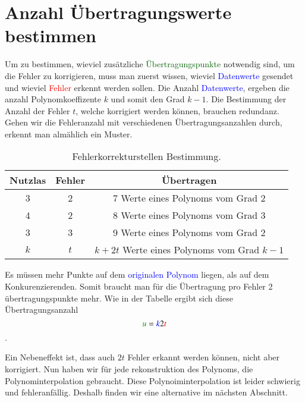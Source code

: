 \section{Anzahl Übertragungswerte bestimmen
\label{reedsolomon:section:Fehlerkorrekturstellen}}
Um zu bestimmen, wieviel zusätzliche \textcolor{darkgreen}{Übertragungspunkte} notwendig sind, um die Fehler zu korrigieren,
    muss man zuerst wissen, wieviel \textcolor{blue}{Datenwerte} gesendet und wieviel \textcolor{red}{Fehler} erkennt werden sollen. 
Die Anzahl \textcolor{blue}{Datenwerte}, ergeben die anzahl Polynomkoeffizente $k$ und somit den Grad $k-1$.
Die Bestimmung der Anzahl der Fehler $t$, welche korrigiert werden können, brauchen redundanz.
Gehen wir die Fehleranzahl mit verschiedenen Übertragungsanzahlen durch, 
    erkennt man almählich ein Muster.
\begin{table}
    \centering
    \begin{tabular}{ c c | c} 
        \hline
        Nutzlas & Fehler & Übertragen \\
        \hline 
        3 & 2 & 7 Werte eines Polynoms vom Grad 2 \\ 
        4 & 2 & 8 Werte eines Polynoms vom Grad 3 \\
        3 & 3 & 9 Werte eines Polynoms vom Grad 2 \\ 
        \hline
        $k$ & $t$ & $k+2t$ Werte eines Polynoms vom Grad $k-1$ \\ 
        \hline
    \end{tabular}
    \caption{ Fehlerkorrekturstellen Bestimmung.}
    \label{tab:fehlerkorrekturstellen}
\end{table}
Es müssen mehr Punkte auf dem \textcolor{blue}{originalen Polynom} liegen, als auf dem Konkurenzierenden.
Somit braucht man für die Übertragung pro Fehler 2 übertragungspunkte mehr.
Wie in der Tabelle ergibt sich diese Übertragungsanzahl
\begin{equation}
    \textcolor{darkgreen}{u}=
    \textcolor{blue}{k}2\textcolor{red}{t}
    \label{reedsolomon:equation2}
\end{equation}.

Ein Nebeneffekt ist, dass auch $2t$ Fehler erkannt werden können, nicht aber korrigiert.
Nun haben wir für jede rekonstruktion des Polynoms, die Polynominterpolation gebraucht.
Diese Polynoiminterpolation ist leider schwierig und fehleranfällig.
Deshalb finden wir eine alternative im nächsten Abschnitt.


